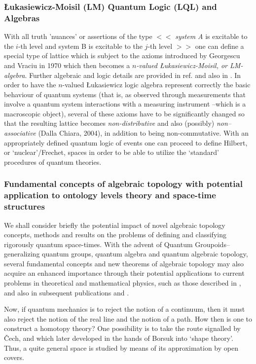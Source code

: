 \documentclass[12pt]{article}
\theoremstyle{plain}
\theoremstyle{definition}
\theoremstyle{plain}
\numberwithin{equation}{section}
\begin{document}
\subsubsection{\L{}ukasiewicz-Moisil (LM) Quantum Logic (LQL) and Algebras}
 With all truth 'nuances' or assertions of the type $<<$ \emph{system A } is excitable
to the $i$-th level and system B is excitable to the $j$-th level $>>$ one can define 
a special type of lattice which is subject to the axioms introduced by Georgescu and Vraciu in 1970 \cite{GGCV70} which then becomes a \emph{$n$-valued \L ukasiewicz-Moisil, or LM-algebra}. Further algebraic and logic details are provided in ref. \cite{GG2k6} and also in \cite{Bggb4}. In order to have the $n$-valued \L{}ukasiewicz logic algebra
represent correctly the basic behaviour of quantum systems (that is, as observed through measurements that involve a quantum system interactions with a measuring instrument --which is a macroscopic object), several of these axioms have to be significantly changed so that the resulting lattice becomes \emph{non-distributive} and also (possibly) \emph{non--associative} (Dalla Chiara, 2004), in addition to being non-commutative. With an appropriately defined quantum logic of events one can proceed to define Hilbert, or `nuclear'/Frechet, spaces in order to be able to utilize the `standard' procedures of quantum theories.

\subsubsection{Fundamental concepts of algebraic topology with potential application to ontology levels theory and 
space-time structures}
 We shall consider briefly the potential impact of novel algebraic topology concepts, methods and results on the problems of defining and classifying rigorously quantum space-times. With the advent of Quantum Groupoids--generalizing quantum groups, quantum algebra and quantum algebraic topology, several fundamental concepts and new theorems of algebraic topology may also acquire an enhanced importance through their potential applications to current problems in theoretical and mathematical physics, such as those described in \cite{BBGG1}, and also in subsequent publications \cite{Bggb4} and \cite{BGB2k7b}. 

 Now, if quantum mechanics is to reject the notion of a continuum,
then it must also reject the notion of the real line and the notion
of a path. How then is one to construct a homotopy theory?
One possibility is to take the route signalled by \v{C}ech, and which
later developed in the hands of Borsuk into `shape theory'. Thus, a quite general space is studied by means of its approximation by open covers.
\end{document}
